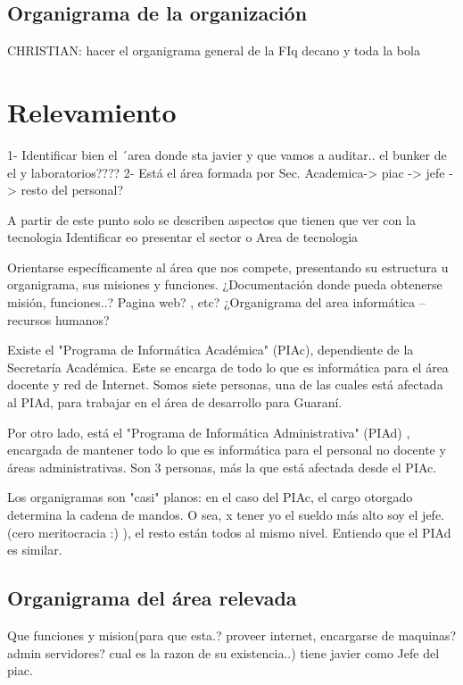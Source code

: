 \documentclass[10pt,a4paper,final]{article}
\begin{document}
\subsection{Organigrama de la organización}
CHRISTIAN: hacer el organigrama general de la FIq decano y toda la bola
\section{Relevamiento}
1- Identificar bien el ´area donde sta javier y que vamos a auditar.. el bunker de el y laboratorios????
2- Está el área formada por Sec. Academica-> piac -> jefe -> resto del personal?

A partir de este punto solo se describen aspectos que tienen que ver con la tecnologia
Identificar eo presentar el sector o Area de tecnologia

Orientarse específicamente al área que nos compete, presentando su estructura u organigrama, sus misiones y funciones.
¿Documentación donde pueda obtenerse misión, funciones..? Pagina web? , etc?
¿Organigrama del area informática – recursos humanos?

Existe el "Programa de Informática Académica" (PIAc), dependiente de la Secretaría Académica. Este se encarga de todo lo que es informática para el área docente y red de Internet. Somos siete personas, una de las cuales está afectada al PIAd, para trabajar en el área de desarrollo para Guaraní.

Por otro lado, está el "Programa de Informática Administrativa" (PIAd) , encargada de mantener todo lo que es informática para el personal no docente y áreas administrativas. Son 3 personas, más la que está afectada desde el PIAc.

Los organigramas son "casi" planos: en el caso del PIAc, el cargo otorgado determina la cadena de mandos. O sea, x tener yo el sueldo más alto soy el jefe.  (cero meritocracia :) ), el resto están todos al mismo nivel. Entiendo que el PIAd es similar.

\subsection{Organigrama del área relevada}
Que funciones y  mision(para que esta.? proveer internet, encargarse de maquinas? admin servidores? cual es la razon de su existencia..) tiene javier como Jefe del piac.
\end{document}
